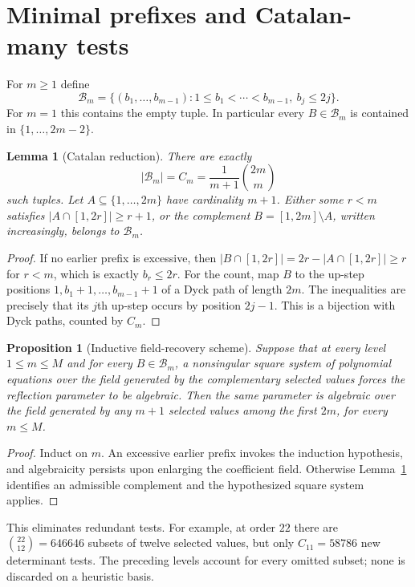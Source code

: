 \documentclass[11pt,a4paper]{article}
\newtheorem{lemma}[theorem]{Lemma}
\newtheorem{proposition}[theorem]{Proposition}
\theoremstyle{definition}\newtheorem{definition}[theorem]{Definition}
\theoremstyle{remark}\newtheorem{remark}[theorem]{Remark}
\begin{document}
\section{Minimal prefixes and Catalan-many tests}\label{sec:catalan}
For $m\ge1$ define
\begin{equation}\label{eq:admissible}
\mathcal B_m=
\{(b_1,\ldots,b_{m-1}):1\le b_1<\cdots<b_{m-1},\ b_j\le2j\}.
\end{equation}
For $m=1$ this contains the empty tuple. In particular every $B\in\mathcal B_m$ is contained in $\{1,\ldots,2m-2\}$.

\begin{lemma}[Catalan reduction]\label{lem:catalan}
There are exactly
\[
|\mathcal B_m|=C_m=\frac1{m+1}\binom{2m}{m}
\]
such tuples. Let $A\subseteq\{1,\ldots,2m\}$ have cardinality $m+1$. Either some $r<m$ satisfies $|A\cap[1,2r]|\ge r+1$, or the complement $B=[1,2m]\setminus A$, written increasingly, belongs to $\mathcal B_m$.
\end{lemma}
\begin{proof}
If no earlier prefix is excessive, then
$|B\cap[1,2r]|=2r-|A\cap[1,2r]|\ge r$ for $r<m$, which is exactly $b_r\le2r$. For the count, map $B$ to the up-step positions
$1,b_1+1,\ldots,b_{m-1}+1$ of a Dyck path of length $2m$. The inequalities are precisely that its $j$th up-step occurs by position $2j-1$. This is a bijection with Dyck paths, counted by $C_m$.
\end{proof}

\begin{proposition}[Inductive field-recovery scheme]\label{prop:prefix}
Suppose that at every level $1\le m\le M$ and for every $B\in\mathcal B_m$, a nonsingular square system of polynomial equations over the field generated by the complementary selected values forces the reflection parameter to be algebraic. Then the same parameter is algebraic over the field generated by \emph{any} $m+1$ selected values among the first $2m$, for every $m\le M$.
\end{proposition}
\begin{proof}
Induct on $m$. An excessive earlier prefix invokes the induction hypothesis, and algebraicity persists upon enlarging the coefficient field. Otherwise Lemma~\ref{lem:catalan} identifies an admissible complement and the hypothesized square system applies.
\end{proof}

This eliminates redundant tests. For example, at order $22$ there are $\binom{22}{12}=646646$ subsets of twelve selected values, but only $C_{11}=58786$ new determinant tests. The preceding levels account for every omitted subset; none is discarded on a heuristic basis.
\end{document}
